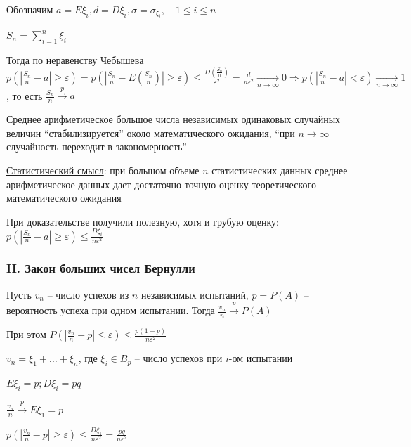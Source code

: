 \documentclass[12pt]{article}
\begin{document}
    \begin{MyProof}
        Обозначим $a = E\xi_i, d = D\xi_i, \sigma = \sigma_{\xi_i}, \quad 1 \leq i \leq n$

        $S_n = \sum_{i = 1}^n \xi_i$

        Тогда по неравенству Чебышева $p\left(\left|\frac{S_n}{n} - a\right| \geq \varepsilon\right) = p\left(\left|\frac{S_n}{n} - E\left(\frac{S_n}{n}\right)\right| \geq \varepsilon\right) \leq
        \frac{D\left(\frac{S_n}{n}\right)}{\varepsilon^2} = \frac{d}{n\varepsilon^2} \underset{n \to \infty}{\longrightarrow} 0 \Longrightarrow p\left(|\frac{S_n}{n} - a| < \varepsilon\right) \underset{n \to \infty}{\longrightarrow} 1$,
        то есть $\frac{S_n}{n} \overset{p}{\longrightarrow} a$
    \end{MyProof}

    Среднее арифметическое большое числа независимых одинаковых случайных величин \enquote{стабилизируется} около математического ожидания,
    \enquote{при $n \to \infty$ случайность переходит в закономерность}

    \underline{Статистический смысл}: при большом объеме $n$ статистических данных среднее арифметическое данных
    дает достаточно точную оценку теоретического математического ожидания

    \Nota При доказательстве получили полезную, хотя и грубую оценку: $p\left(\left|\frac{S_n}{n} - a\right| \geq \varepsilon\right) \leq \frac{D\xi_i}{n\varepsilon^2}$

    \subsubsection{II. Закон больших чисел Бернулли}

    \hypertarget{lawofbignumbersbernoulli2}{}

    \begin{MyTheorem}
        \Ths Пусть $v_n$ -- число успехов из $n$ независимых испытаний, $p = P(A)$ -- вероятность успеха при одном испытании.
        Тогда $\frac{v_n}{n} \overset{p}{\longrightarrow} P(A)$
    \end{MyTheorem}

    При этом $P\left(\left|\frac{v_n}{n} - p\right| \leq \varepsilon\right) \leq \frac{p(1 - p)}{n\varepsilon^2}$

    \begin{MyProof}
        $v_n = \xi_1 + \dots + \xi_n$, где $\xi_i \in B_p$ -- число успехов при $i$-ом испытании

        $E\xi_i = p; D\xi_i = pq$

        $\frac{v_n}{n} \overset{p}{\longrightarrow} E\xi_1 = p$

        $p\left(\left|\frac{v_n}{n} - p\right| \geq \varepsilon\right) \leq \frac{D\xi_1}{n\varepsilon^2} = \frac{pq}{n\varepsilon^2}$
    \end{MyProof}
\end{document}

